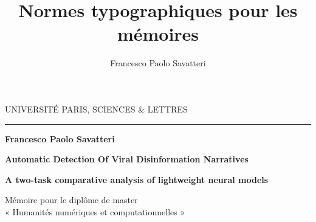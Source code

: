 \documentclass[a4paper,twoside,12pt]{book}
\title{Normes typographiques pour les mémoires}
\author{Francesco Paolo Savatteri}
\begin{document}
	
	
	
	
	
	
	\makeatletter
	\def\cleardoublepage{\clearpage\if@twoside \ifodd\c@page\else
		\hbox{}
		\vspace*{\fill}
		\begin{center}
			This page was intentionally left blank.
		\end{center}
		\vspace{\fill}
		\thispagestyle{empty}
		\newpage
		\if@twocolumn\hbox{}\newpage\fi\fi\fi}
	\makeatother
	
	\begin{titlepage}
		\begin{center}
			
			\bigskip
			
			\begin{large}
				UNIVERSITÉ PARIS, SCIENCES \& LETTRES
			\end{large}
			\begin{center}\rule{2cm}{0.02cm}\end{center}
			
			\bigskip
			\bigskip
			\bigskip
			\begin{Large}
				\textbf{Francesco Paolo Savatteri}\\
			\end{Large}
			
			\bigskip
			\bigskip
			\bigskip
			
			\begin{Huge}
				\textbf{Automatic Detection Of Viral Disinformation Narratives}\\
			\end{Huge}
			\bigskip
			\bigskip
			\begin{LARGE}
				\textbf{A two-task comparative analysis of lightweight neural models}\\
			\end{LARGE}
			
			\bigskip
			\bigskip
			\bigskip
			\begin{large}
			\end{large}
			\vfill
			
			\begin{large}
				Mémoire pour le diplôme de master \\
				« Humanités numériques et computationnelles » \\
			\end{large}
			
		\end{center}
	\end{titlepage}
	
\end{document}
